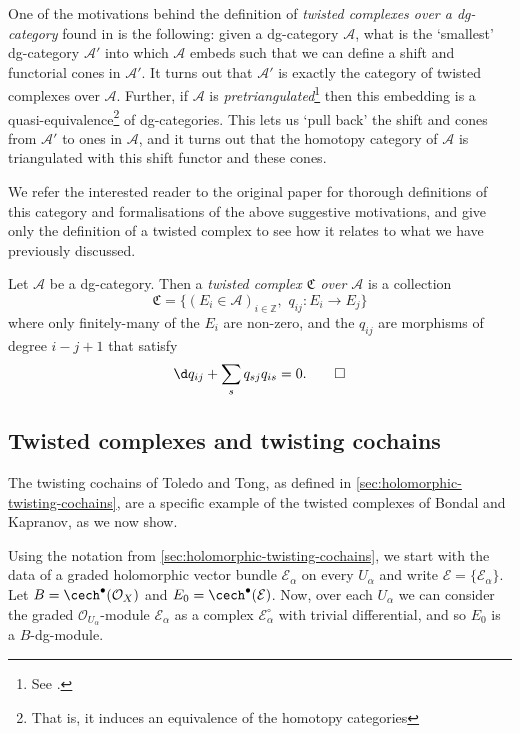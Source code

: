         One of the motivations behind the definition of \emph{twisted complexes over a dg-category} found in \cite{Bondal:1991un} is the following: given a dg-category $\mathcal{A}$, what is the `smallest' dg-category $\mathcal{A'}$ into which $\mathcal{A}$ embeds such that we can define a shift and functorial cones in $\mathcal{A'}$.
        It turns out that $\mathcal{A'}$ is exactly the category of twisted complexes over $\mathcal{A}$.
        Further, if $\mathcal{A}$ is \emph{pretriangulated}\footnote{See \cite[§1]{Bondal:1991un}.} then this embedding is a quasi-equivalence\footnote{That is, it induces an equivalence of the homotopy categories} of dg-categories.
        This lets us `pull back' the shift and cones from $\mathcal{A'}$ to ones in $\mathcal{A}$, and it turns out that the homotopy category of $\mathcal{A}$ is triangulated with this shift functor and these cones.

        We refer the interested reader to the original paper for thorough definitions of this category and formalisations of the above suggestive motivations, and give only the definition of a twisted complex to see how it relates to what we have previously discussed.

        \begin{definition}
            Let $\mathcal{A}$ be a dg-category.
            Then a \emph{twisted complex $\mathfrak{C}$ over $\mathcal{A}$} is a collection
            \[
                \mathfrak{C} = \{(E_i\in\mathcal{A})_{i\in\mathbb{Z}},\,\, q_{ij}\colon E_i\to E_j\}
            \]
            where only finitely-many of the $E_i$ are non-zero, and the $q_{ij}$ are morphisms of degree $i-j+1$ that satisfy
            \begin{equation}
                \d q_{ij}+\sum_s q_{sj}q_{is}=0.\qedhere
            \end{equation}
        \end{definition}

    \subsection{Twisted complexes and twisting cochains}

        The twisting cochains of Toledo and Tong, as defined in \cref{sec:holomorphic-twisting-cochains}, are a specific example of the twisted complexes of Bondal and Kapranov, as we now show.

        Using the notation from \cref{sec:holomorphic-twisting-cochains}, we start with the data of a graded holomorphic vector bundle $\mathcal{E}_\alpha$ on every $U_\alpha$ and write $\mathcal{E}=\{\mathcal{E}_\alpha\}$.
        Let $B=\cech^\bullet(\mathcal{O}_X)$ and $E_0=\cech^\bullet(\mathcal{E})$.
        Now, over each $U_\alpha$ we can consider the graded $\mathcal{O}_{U_\alpha}$-module $\mathcal{E}_\alpha$ as a complex $\mathcal{E}_\alpha^\circ$ with trivial differential, and so $E_0$ is a $B$-dg-module.

